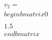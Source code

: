 \documentclass[preview]{standalone}
\begin{document}
\begin{align*}
v_2 = \\begin{bmatrix} 0 \\\\ 1.5 \\end{bmatrix}
\end{align*}
\end{document}
